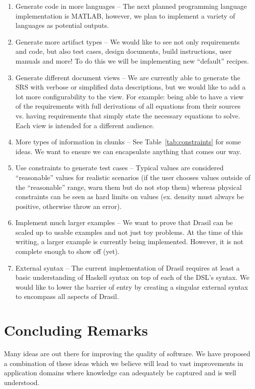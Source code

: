 \documentclass[preprint, 10pt]{sigplanconf}
\begin{document}
\begin{enumerate}
\item Generate code in more languages -- The next planned programming language
implementation is MATLAB, however, we plan to implement a variety of languages
as potential outputs.
\item Generate more artifact types -- We would like to see not only requirements
and code, but also test cases, design documents, build instructions, user
manuals and more! To do this we will be implementing new ``default'' recipes.
\item Generate different document views -- We are currently able to generate the
SRS with verbose or simplified data descriptions, but we would like to add a lot
more configurability to the view. For example: being able to have a view of the
requirements with full derivations of all equations from their sources vs.
having requirements that simply state the necessary equations to solve. Each
view is intended for a different audience.
\item More types of information in chunks -- See Table~\ref{tab:constraints} for
some ideas. We want to ensure we can encapsulate anything that comes our way.
\item Use constraints to generate test cases -- Typical values are considered
``reasonable'' values for realistic scenarios (if the user chooses values
outside of the ``reasonable'' range, warn them but do not stop them) whereas
physical constraints can be seen as hard limits on values (ex. density must
always be positive, otherwise throw an error).
\item Implement much larger examples -- We want to prove that Drasil can be
scaled up to usable examples and not just toy problems. At the time of this
writing, a larger example is currently being implemented. However, it is not
complete enough to show off (yet).
\item External syntax -- The current implementation of Drasil requires at least a basic understanding of Haskell syntax on top of each of the DSL's syntax. We would like to lower the barrier of entry by creating a singular external syntax to encompass all aspects of Drasil.
\end{enumerate}

\section{Concluding Remarks}
\label{sec:conclusion}

Many ideas are out there for improving the quality of software. We have proposed
a combination of these ideas which we believe will lead to vast improvements in
application domains where knowledge can adequately be captured and is well
understood.
\end{document}

